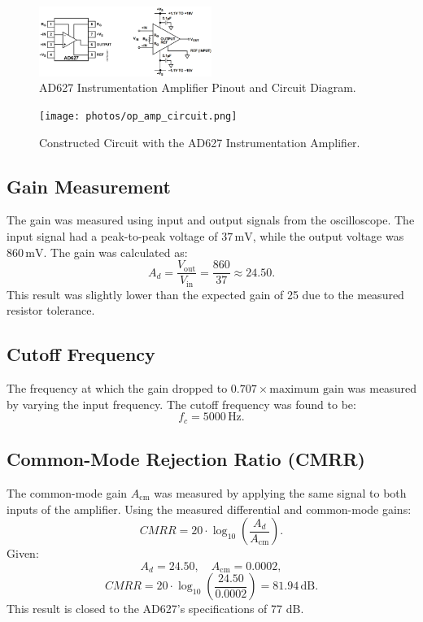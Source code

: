 \begin{figure}[H]
  \centering
  \includegraphics[width=0.5\textwidth]{photos/ad627_instrumentation_amplifier_pinout_and_diagram.png}
  \caption{AD627 Instrumentation Amplifier Pinout and Circuit Diagram.}
  \label{fig:ad627_diagram}
\end{figure}

\begin{figure}[H]
  \centering
  \texttt{[image: photos/op\_amp\_circuit.png]}
  \caption{Constructed Circuit with the AD627 Instrumentation Amplifier.}
  \label{fig:circuit}
\end{figure}

\subsection{Gain Measurement}
The gain was measured using input and output signals from the oscilloscope. The input signal had a peak-to-peak voltage of
\( 37 \, \text{mV} \), while the output voltage was \( 860 \, \text{mV} \). The gain was calculated as:
\[
  A_d = \frac{V_\text{out}}{V_\text{in}} = \frac{860}{37} \approx 24.50.
\]
This result was slightly lower than the expected gain of 25 due to the measured resistor tolerance.

\subsection{Cutoff Frequency}
The frequency at which the gain dropped to \( 0.707 \times \text{maximum gain} \) was measured by varying the input frequency.
The cutoff frequency was found to be:
\[
  f_c = 5000 \, \text{Hz}.
\]

\subsection{Common-Mode Rejection Ratio (CMRR)}
The common-mode gain \( A_\text{cm} \) was measured by applying the same signal to both inputs of the amplifier. Using the measured
differential and common-mode gains:
\[
  CMRR = 20 \cdot \log_{10}\left(\frac{A_d}{A_\text{cm}}\right).
\]
Given:
\[
  A_d = 24.50, \quad A_\text{cm} = 0.0002,
\]
\[
  CMRR = 20 \cdot \log_{10}\left(\frac{24.50}{0.0002}\right) = 81.94 \, \text{dB}.
\]
This result is closed to the AD627's specifications of 77 dB.

